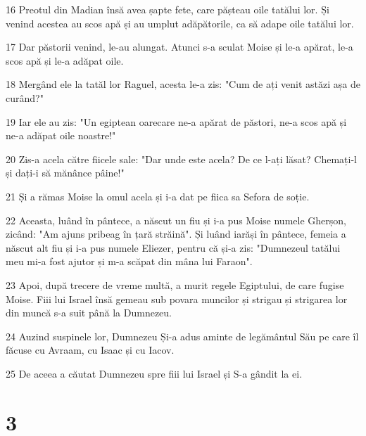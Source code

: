 \par 16 Preotul din Madian însă avea șapte fete, care pășteau oile tatălui lor. Și venind acestea au scos apă și au umplut adăpătorile, ca să adape oile tatălui lor.
\par 17 Dar păstorii venind, le-au alungat. Atunci s-a sculat Moise și le-a apărat, le-a scos apă și le-a adăpat oile.
\par 18 Mergând ele la tatăl lor Raguel, acesta le-a zis: "Cum de ați venit astăzi așa de curând?"
\par 19 Iar ele au zis: "Un egiptean oarecare ne-a apărat de păstori, ne-a scos apă și ne-a adăpat oile noastre!"
\par 20 Zis-a acela către fiicele sale: "Dar unde este acela? De ce l-ați lăsat? Chemați-l și dați-i să mănânce pâine!"
\par 21 Și a rămas Moise la omul acela și i-a dat pe fiica sa Sefora de soție.
\par 22 Aceasta, luând în pântece, a născut un fiu și i-a pus Moise numele Gherșon, zicând: "Am ajuns pribeag în țară străină". Și luând iarăși în pântece, femeia a născut alt fiu și i-a pus numele Eliezer, pentru că și-a zis: "Dumnezeul tatălui meu mi-a fost ajutor și m-a scăpat din mâna lui Faraon".
\par 23 Apoi, după trecere de vreme multă, a murit regele Egiptului, de care fugise Moise. Fiii lui Israel însă gemeau sub povara muncilor și strigau și strigarea lor din muncă s-a suit până la Dumnezeu.
\par 24 Auzind suspinele lor, Dumnezeu Și-a adus aminte de legământul Său pe care îl făcuse cu Avraam, cu Isaac și cu Iacov.
\par 25 De aceea a căutat Dumnezeu spre fiii lui Israel și S-a gândit la ei.

\chapter{3}

